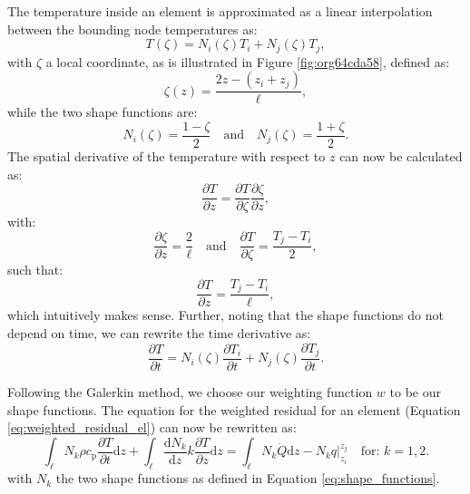 \documentclass[10pt, a4paper, twoside, headinclude,footinclude, BCOR5mm]{scrartcl}
\begin{document}
The temperature inside an element is approximated as a linear interpolation between the bounding node temperatures as:
\begin{equation}
  T(\zeta) = N_i(\zeta)T_i + N_j(\zeta)T_j,
  \label{eq:T_approx}
\end{equation}
with \(\zeta\) a local coordinate, as is illustrated in Figure \ref{fig:org64cda58}, defined as:
\begin{equation*}
  \zeta(z) = \frac{2z - (z_i + z_j)}{\ell},
\end{equation*}
while the two shape functions are:
\begin{equation}
  N_i(\zeta) = \frac{1-\zeta}{2} \quad\text{and}\quad
  N_j(\zeta) = \frac{1+\zeta}{2}.
  \label{eq:shape_functions}
\end{equation}
The spatial derivative of the temperature with respect to \(z\) can now be calculated as:
\begin{equation*}
  \frac{\partial T}{\partial z} =
  \frac{\partial T}{\partial \zeta}\frac{\partial \zeta}{\partial z},
\end{equation*}
with:
\begin{equation*}
  \frac{\partial \zeta}{\partial z} = \frac{2}{\ell}
  \quad\text{and}\quad
  \frac{\partial T}{\partial \zeta} = \frac{T_j - T_i}{2},
\end{equation*}
such that:
\begin{equation}
  \frac{\partial T}{\partial z} = \frac{T_j - T_i}{\ell},
  \label{eq:dTdz}
\end{equation}
which intuitively makes sense. Further, noting that the shape functions do not depend on time, we can rewrite the time derivative as:
\begin{equation}
  \frac{\partial T}{\partial t} =
  N_i(\zeta)\frac{\partial T_i}{\partial t} +
  N_j(\zeta)\frac{\partial T_j}{\partial t}.
  \label{eq:dTdt}
\end{equation}

Following the Galerkin method, we choose our weighting function \(w\) to be our shape functions. The equation for the weighted residual for an element (Equation \ref{eq:weighted_residual_el}) can now be rewritten as:
\begin{equation}
  \int_\ell N_k \rho c_\text{p}\frac{\partial T}{\partial t} \text{d}z +
  \int_\ell
  \frac{\text{d}N_k}{\text{d}z}k\frac{\partial T}{\partial z}\text{d}z  =
  \int_\ell N_k \dot{Q} \text{d}z - N_k q \Biggr|_{z_i}^{z_j}
  \quad\text{for: } k = 1,2.
  \label{eq:galerkin}
\end{equation}
with \(N_k\) the two shape functions as defined in Equation \ref{eq:shape_functions}.
\end{document}
